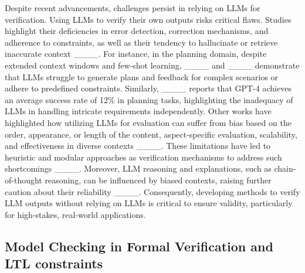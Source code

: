 {Despite recent advancements, challenges persist in relying on LLMs for verification. Using LLMs to verify their own outputs risks critical flaws. Studies highlight their deficiencies in error detection, correction mechanisms, and adherence to constraints, as well as their tendency to hallucinate or retrieve inaccurate context ____. 
For instance, in the planning domain, despite extended context windows and few-shot learning, ____ and ____ demonstrate that LLMs struggle to generate plans and feedback for complex scenarios or adhere to predefined constraints. Similarly, ____ reports that GPT-4 achieves an average success rate of 12\% in planning tasks, highlighting the inadequacy of LLMs in handling intricate requirements independently.
Other works have highlighted how utilizing LLMs for evaluation can suffer from bias based on the order, appearance, or length of the content, aspect-specific evaluation, scalability, and effectiveness in diverse contexts ____. 
These limitations have led to heuristic and modular approaches as verification mechanisms to address such shortcomings ____. Moreover, LLM reasoning and explanations, such as chain-of-thought reasoning, can be influenced by biased contexts, raising further caution about their reliability ____. Consequently, developing methods to verify LLM outputs without relying on LLMs is critical to ensure validity, particularly for high-stakes, real-world applications.

}







\subsection{Model Checking in Formal Verification and LTL constraints}\label{hello}


